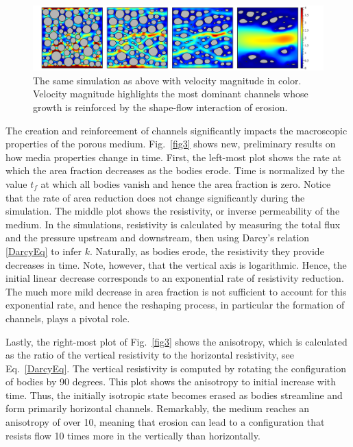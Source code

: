 \documentclass[11pt]{article}
\begin{document}
\begin{figure}%
\begin{center}
\includegraphics[width = 0.99 \textwidth]{./figs/80circ8vel.pdf}
\caption{\label{fig2} The same simulation as above with velocity magnitude in color. Velocity magnitude highlights the most dominant channels whose growth is reinforced by the shape-flow interaction of erosion.}
\end{center}
\end{figure}
 

The creation and reinforcement of channels significantly impacts the macroscopic properties of the porous medium. Fig.~\ref{fig3} shows new, preliminary results on how media properties change in time. First, the left-most plot shows the rate at which the area fraction decreases as the bodies erode. Time is normalized by the value $t_f$ at which all bodies vanish and hence the area fraction is zero. Notice that the rate of area reduction does not change significantly during the simulation. The middle plot shows the resistivity, or inverse permeability of the medium. In the simulations, resistivity is calculated by measuring the total flux and the pressure upstream and downstream, then using Darcy's relation \eqref{DarcyEq} to infer $k$. Naturally, as bodies erode, the resistivity they provide decreases in time. Note, however, that the vertical axis is logarithmic. Hence, the initial linear decrease corresponds to an exponential rate of resistivity reduction. The much more mild decrease in area fraction is not sufficient to account for this exponential rate, and hence the reshaping process, in particular the formation of channels, plays a pivotal role.

Lastly, the right-most plot of Fig.~\ref{fig3} shows the anisotropy, which is calculated as the ratio of the vertical resistivity to the horizontal resistivity, see Eq.~\eqref{DarcyEq}. The vertical resistivity is computed by rotating the configuration of bodies by 90 degrees. This plot shows the anisotropy to initial increase with time. Thus, the initially isotropic state becomes erased as bodies streamline and form primarily horizontal channels. Remarkably, the medium reaches an anisotropy of over 10, meaning that erosion can lead to a configuration that resists flow 10 times more in the vertically than horizontally.
\end{document}
